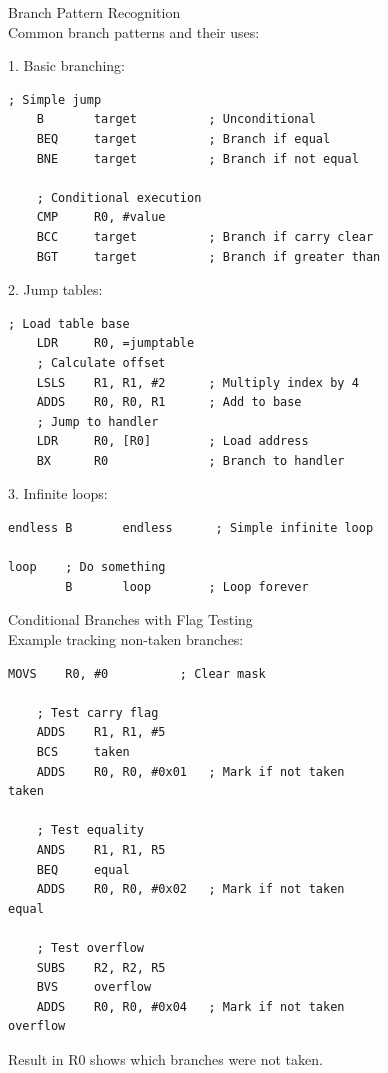 \begin{KR}{Branch Pattern Recognition}\\
Common branch patterns and their uses:

1. Basic branching:
\begin{lstlisting}[language=armasm, style=basesmol]
    ; Simple jump
    B       target          ; Unconditional
    BEQ     target          ; Branch if equal
    BNE     target          ; Branch if not equal
    
    ; Conditional execution
    CMP     R0, #value
    BCC     target          ; Branch if carry clear
    BGT     target          ; Branch if greater than
\end{lstlisting}

2. Jump tables:
\begin{lstlisting}[language=armasm, style=basesmol]
    ; Load table base
    LDR     R0, =jumptable
    ; Calculate offset
    LSLS    R1, R1, #2      ; Multiply index by 4
    ADDS    R0, R0, R1      ; Add to base
    ; Jump to handler
    LDR     R0, [R0]        ; Load address
    BX      R0              ; Branch to handler
\end{lstlisting}

3. Infinite loops:
\begin{lstlisting}[language=armasm, style=basesmol]
endless B       endless      ; Simple infinite loop

loop    ; Do something
        B       loop        ; Loop forever
\end{lstlisting}
\end{KR}

\begin{example2}{Conditional Branches with Flag Testing}\\
Example tracking non-taken branches:
\begin{lstlisting}[language=armasm, style=basesmol]
    MOVS    R0, #0          ; Clear mask
    
    ; Test carry flag
    ADDS    R1, R1, #5
    BCS     taken
    ADDS    R0, R0, #0x01   ; Mark if not taken
taken

    ; Test equality
    ANDS    R1, R1, R5
    BEQ     equal
    ADDS    R0, R0, #0x02   ; Mark if not taken
equal

    ; Test overflow
    SUBS    R2, R2, R5
    BVS     overflow
    ADDS    R0, R0, #0x04   ; Mark if not taken
overflow
\end{lstlisting}

Result in R0 shows which branches were not taken.
\end{example2}

